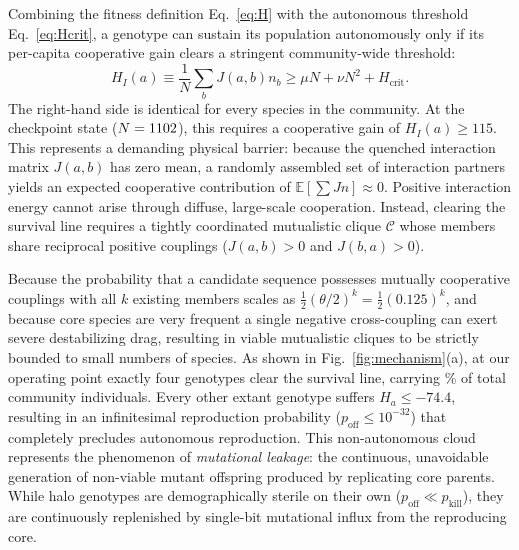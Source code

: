 \documentclass[twocolumn,amsmath,amssymb,aps,pra,10pt,floatfix,nofootinbib]{revtex4-2}
\begin{document}
Combining the fitness definition Eq.~\eqref{eq:H} with the autonomous threshold Eq.~\eqref{eq:Hcrit}, a genotype can sustain its population autonomously only if its per-capita cooperative gain clears a stringent community-wide threshold:
\begin{equation}
H_I(a) \equiv \frac{1}{N} \sum_b J(a,b) n_b \ge \mu N + \nu N^2 + H_{\text{crit}}.
\label{eq:line}
\end{equation}
The right-hand side is identical for every species in the community. At the checkpoint state ($N = 1102$), this requires a cooperative gain of $H_I(a) \ge 115$. This represents a demanding physical barrier: because the quenched interaction matrix $J(a,b)$ has zero mean, a randomly assembled set of interaction partners yields an expected cooperative contribution of $\mathbb{E}[\sum J n] \approx 0$. Positive interaction energy cannot arise through diffuse, large-scale cooperation. Instead, clearing the survival line requires a tightly coordinated mutualistic clique $\mathcal{C}$ whose members share reciprocal positive couplings ($J(a,b) > 0$ and $J(b,a) > 0$).

Because the probability that a candidate sequence possesses mutually cooperative couplings with all $k$ existing members scales as $\frac{1}{2}(\theta / 2)^k = \frac{1}{2}(0.125)^k$\footnotemark[2], and because core species are very frequent a single negative cross-coupling can exert severe destabilizing drag, resulting in viable mutualistic cliques to be strictly bounded to small numbers of species. As shown in Fig.~\ref{fig:mechanism}(a), at our operating point exactly four genotypes clear the survival line, carrying \corebio\% of total community individuals. Every other extant genotype suffers $H_a \le -74.4$, resulting in an infinitesimal reproduction probability ($p_{\text{off}} \le 10^{-32}$) that completely precludes autonomous reproduction. This non-autonomous cloud represents the phenomenon of \textit{mutational leakage}: the continuous, unavoidable generation of non-viable mutant offspring produced by replicating core parents. While halo genotypes are demographically sterile on their own ($p_{\text{off}} \ll p_{\text{kill}}$), they are continuously replenished by single-bit mutational influx from the reproducing core.
\end{document}
